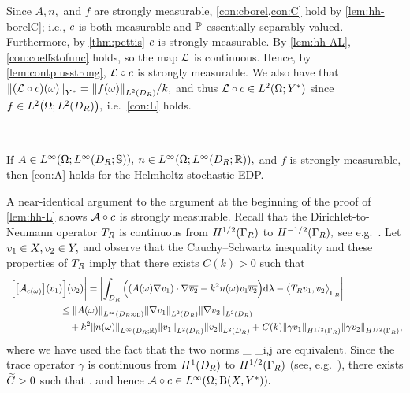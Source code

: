 Since $A,n,$ and $f$ are strongly measurable, \cref{con:cborel,con:C} hold by \cref{lem:hh-borelC}; i.e., $c$ is both measurable and $\mathbb P$-essentially separably valued. Furthermore, by \cref{thm:pettis} $c$ is strongly measurable. By \cref{lem:hh-AL}, \cref{con:coeffstofunc} holds, so the map $\mathcal L$ is continuous. Hence, by \cref{lem:contplusstrong}, $\mathcal L\circ c$ is strongly measurable. We also have that
$\NYs{\mleft(\rhs\circ\coeff\mright)(\omega)} = \NLtDR{f(\omega)}/k,$
and thus $\rhs\circ\coeff \in \LtOYs$ since $f \in \LtOLtDR,$ i.e.~\cref{con:L} holds.
\epf

\label{lem:hh-A}

\

\noindent If $A \in \LiOLiDRRRdtd,$ $n \in \LiOLiDRRR,$ and $f$ is strongly measurable, then \cref{con:A} holds for the Helmholtz stochastic EDP.
\ele

A near-identical argument to the argument at the beginning of the proof of \cref{lem:hh-L} shows $\mathcal A\circ c$ is strongly measurable. Recall that the Dirichlet-to-Neumann operator $T_{R}$ is continuous from $\HhGR$ to $\HmhGR,$ see e.g.~\cite[Theorem 2.6.4]{Ne:01}. Let $v_{1} \in X, v_{2} \in Y,$ and observe that the Cauchy--Schwartz inequality and these properties of $T_{R}$
imply that there exists $C(k) > 0$ such that 
\begin{align*}
\bigg|\Big[\mleft[\Acomega\mright](\vo)\Big](\vt)\bigg| &= \abs{\int_{\DR} \Big(\mleft(A(\omega) \grad \vo\mright)\cdot\grad \vtb - k^2n(\omega) \vo\vtb \Big)\dd\Leb- \IPGRbig{\DtN \vo}{\vt}}\\
&\hspace{-1cm}\leq \NLiDRRRdtd{A(\omega)}  \NLtDR{\grad \vo}\NLtDR{\grad \vt}\\
&\hspace{-1cm}\quad+ k^2 \NLiDRRR{n(\omega)}\NLtDR{\vo}\NLtDR{\vt}+ C(k) \NHhGR{\gamma\vo}\NHhGR{\gamma\vt},
\end{align*}
where we have used the fact that the two norms
\beq\label{eq:normsdef}
 \esssup_{\bx \in \DR}  \quad\tand\quad{} \de \max_{i,j \in {}} 
\eeq
are equivalent.
Since the trace operator $\gamma$ is continuous from $\HoDR$ to $\HhGR$ (see, e.g.~\cite[Theorem 3.38]{Mc:00}), there exists $\widetilde{C} > 0$ such that
\beqs
\Nhomspace{\mleft(\toform\circ\coeff\mright)(\omega)}\leq\Ctilde\max{}\NHokDR{\vo}\NHokDR{\vt}.
\eeqs
and hence $\toform\circ\coeff \in \LiOhomspace.$
\epf

